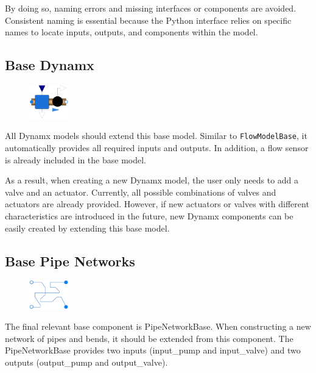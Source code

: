\documentclass[we,final,11pt,oneside,openany]{uantwerpenbamathesis}
\begin{document}
By doing so, naming errors and missing interfaces or components are avoided.
Consistent naming is essential because the Python interface relies on specific names to locate inputs, outputs, and components within the model.

\subsection{Base Dynamx}
\label{subsec:base-dynamx}

\begin{figure}
    \centering
    \includegraphics[width=0.15\textwidth]{Images/components/dynamx}
\end{figure}

All Dynamx models should extend this base model.
Similar to \texttt{FlowModelBase}, it automatically provides all required inputs and outputs.
In addition, a flow sensor is already included in the base model.

As a result, when creating a new Dynamx model, the user only needs to add a valve and an actuator.
Currently, all possible combinations of valves and actuators are already provided.
However, if new actuators or valves with different characteristics are introduced in the future, new Dynamx components can be easily created by extending this base model.

\subsection{Base Pipe Networks}
\label{subsec:base-pipe-networks}

\begin{figure}
    \centering
    \includegraphics[width=0.15\textwidth]{Images/components/pipe-network}
\end{figure}

The final relevant base component is PipeNetworkBase.
When constructing a new network of pipes and bends, it should be extended from this component.
The PipeNetworkBase provides two inputs (input\_pump and input\_valve) and two outputs (output\_pump and output\_valve).
\end{document}
